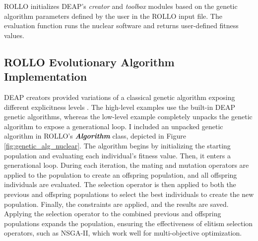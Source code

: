 \gls{ROLLO} initializes \gls{DEAP}'s \textit{creator} and \textit{toolbox} modules 
based on the genetic algorithm parameters defined by the user in the \gls{ROLLO} 
input file. 
The evaluation function runs the nuclear software and returns user-defined 
fitness values. 

\subsection{ROLLO Evolutionary Algorithm Implementation}
\gls{DEAP} creators provided variations of a classical genetic algorithm 
exposing different explicitness levels \cite{fortin_deap_2012}. 
The high-level examples use the built-in \gls{DEAP} genetic algorithms, 
whereas the low-level example completely unpacks the genetic algorithm to expose 
a generational loop. 
I included an unpacked genetic algorithm in ROLLO's 
\textbf{\textit{Algorithm}} class, depicted in Figure \ref{fig:genetic_alg_nuclear}. 
The algorithm begins by initializing the starting population and evaluating 
each individual's fitness value. 
Then, it enters a generational loop. 
During each iteration, the mating and mutation operators are applied to the population
to create an offspring population, and all offspring individuals are evaluated. 
The selection operator is then applied to both the previous and offspring populations 
to select the best individuals to create the new population. 
Finally, the constraints are applied, and the results are saved.
Applying the selection operator to the combined previous and offspring 
populations expands the population, ensuring the effectiveness of 
elitism selection operators, such as NSGA-II, which work well 
for multi-objective optimization. 

